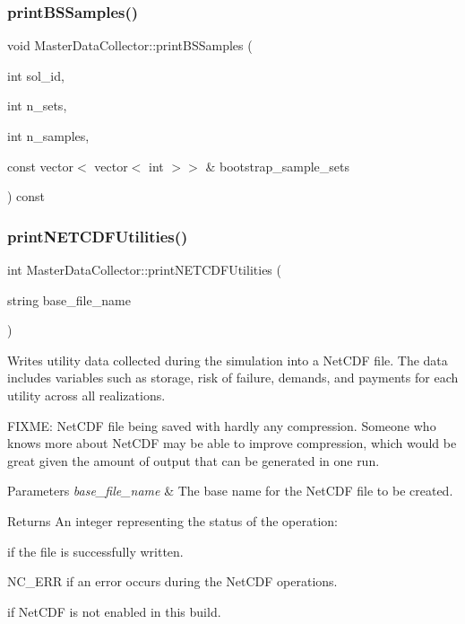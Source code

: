 \subsubsection{\texorpdfstring{print\+B\+S\+Samples()}{printBSSamples()}}
{\footnotesize\ttfamily void Master\+Data\+Collector\+::print\+B\+S\+Samples (\begin{DoxyParamCaption}\item[{int}]{sol\+\_\+id,  }\item[{int}]{n\+\_\+sets,  }\item[{int}]{n\+\_\+samples,  }\item[{const vector$<$ vector$<$ int $>$$>$ \&}]{bootstrap\+\_\+sample\+\_\+sets }\end{DoxyParamCaption}) const}

\mbox{\label{classMasterDataCollector_a87dd0c5e19af4baee55b3adfeabe1d01}} 
\subsubsection{\texorpdfstring{print\+N\+E\+T\+C\+D\+F\+Utilities()}{printNETCDFUtilities()}}
{\footnotesize\ttfamily int Master\+Data\+Collector\+::print\+N\+E\+T\+C\+D\+F\+Utilities (\begin{DoxyParamCaption}\item[{string}]{base\+\_\+file\+\_\+name }\end{DoxyParamCaption})}



Writes utility data collected during the simulation into a Net\+C\+DF file. The data includes variables such as storage, risk of failure, demands, and payments for each utility across all realizations. 

F\+I\+X\+ME\+: Net\+C\+DF file being saved with hardly any compression. Someone who knows more about Net\+C\+DF may be able to improve compression, which would be great given the amount of output that can be generated in one run.


\begin{DoxyParams}{Parameters}
{\em base\+\_\+file\+\_\+name} & The base name for the Net\+C\+DF file to be created.\\
\hline
\end{DoxyParams}
\begin{DoxyReturn}{Returns}
An integer representing the status of the operation\+:
\begin{DoxyItemize}
\item {} if the file is successfully written.
\item {\ttfamily N\+C\+\_\+\+E\+RR} if an error occurs during the Net\+C\+DF operations.
\item {} if Net\+C\+DF is not enabled in this build.
\end{DoxyItemize}
\end{DoxyReturn}


